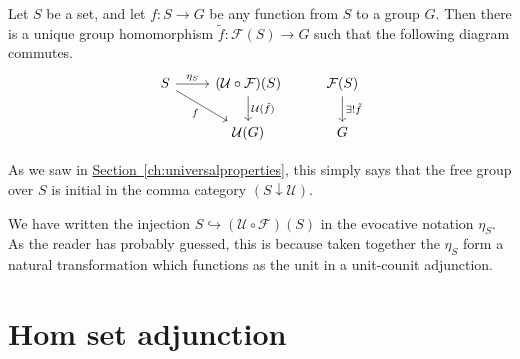 \documentclass[main.tex]{subfiles}
\begin{document}
Let $S$ be a set, and let $f\colon S \to G$ be any function from $S$ to a group $G$. Then there is a unique group homomorphism $\tilde{f}\colon \mathcal{F}(S) \to G$ such that the following diagram commutes.
\begin{equation*}
  \begin{tikzcd}
    S
    \arrow[r, "\eta_{S}"]
    \arrow[rd, swap, "f"]
    & (\mathcal{U} \circ \mathcal{F})(S)
    \arrow[d, "\mathcal{U}(\tilde{f})"]
    & \mathcal{F}(S)
    \arrow[d, "\exists!\tilde{f}"]
    \\
    & \mathcal{U}(G)
    & G
  \end{tikzcd}
\end{equation*}

As we saw in \hyperref[ch:universalproperties]{Section~\ref*{ch:universalproperties}}, this simply says that the free group over $S$ is initial in the comma category $(S \downarrow \mathcal{U})$.

We have written the injection $S \hookrightarrow (\mathcal{U} \circ \mathcal{F})(S)$ in the evocative notation $\eta_{S}$. As the reader has probably guessed, this is because taken together the $\eta_{S}$ form a natural transformation which functions as the unit in a unit-counit adjunction.

\section{Hom set adjunction}
\label{sec:hom_set_adjunction}
\end{document}
